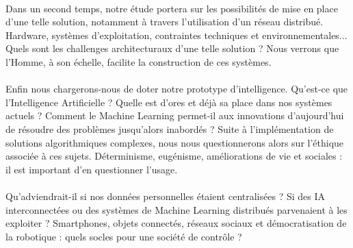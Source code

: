 \paragraph{} Dans un second temps, notre étude portera sur les possibilités de mise en place
d'une telle solution, notamment à travers l'utilisation d'un réseau distribué. Hardware,
systèmes d'exploitation, contraintes techniques et environnementales... Quels sont les challenges
architecturaux d'une telle solution ? Nous verrons que l'Homme, à son échelle, facilite la 
construction de ces systèmes.

\paragraph{} Enfin nous chargerons-nous de doter notre prototype d'intelligence. Qu'est-ce que
l'Intelligence Artificielle ? Quelle est d'ores et déjà sa place dans nos systèmes actuels ?
Comment le Machine Learning permet-il aux innovations d'aujourd'hui de résoudre des problèmes
jusqu'alors inabordés ? Suite à l'implémentation de solutions algorithmiques complexes,
nous nous questionnerons alors sur l'éthique associée à ces sujets. Déterminisme,
eugénisme, améliorations de vie et sociales : il est important d'en questionner l'usage.

\paragraph{}  Qu'adviendrait-il si nos données personnelles étaient centralisées ? Si des IA interconnectées
ou des systèmes de Machine Learning distribués parvenaient à les exploiter ? Smartphones,
objets connectés, réseaux sociaux et démocratisation de la robotique : quels socles pour une
société de contrôle ?